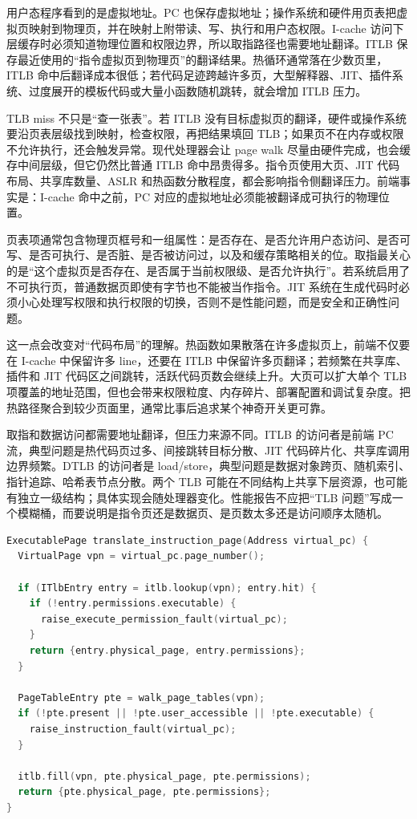 用户态程序看到的是虚拟地址。PC 也保存虚拟地址；操作系统和硬件用页表把虚拟页映射到物理页，并在映射上附带读、写、执行和用户态权限。I-cache 访问下层缓存时必须知道物理位置和权限边界，所以取指路径也需要地址翻译。ITLB 保存最近使用的“指令虚拟页到物理页”的翻译结果。热循环通常落在少数页里，ITLB 命中后翻译成本很低；若代码足迹跨越许多页，大型解释器、JIT、插件系统、过度展开的模板代码或大量小函数随机跳转，就会增加 ITLB 压力。

TLB miss 不只是“查一张表”。若 ITLB 没有目标虚拟页的翻译，硬件或操作系统要沿页表层级找到映射，检查权限，再把结果填回 TLB；如果页不在内存或权限不允许执行，还会触发异常。现代处理器会让 page walk 尽量由硬件完成，也会缓存中间层级，但它仍然比普通 ITLB 命中昂贵得多。指令页使用大页、JIT 代码布局、共享库数量、ASLR 和热函数分散程度，都会影响指令侧翻译压力。前端事实是：I-cache 命中之前，PC 对应的虚拟地址必须能被翻译成可执行的物理位置。

页表项通常包含物理页框号和一组属性：是否存在、是否允许用户态访问、是否可写、是否可执行、是否脏、是否被访问过，以及和缓存策略相关的位。取指最关心的是“这个虚拟页是否存在、是否属于当前权限级、是否允许执行”。若系统启用了不可执行页，普通数据页即使有字节也不能被当作指令。JIT 系统在生成代码时必须小心处理写权限和执行权限的切换，否则不是性能问题，而是安全和正确性问题。

这一点会改变对“代码布局”的理解。热函数如果散落在许多虚拟页上，前端不仅要在 I-cache 中保留许多 line，还要在 ITLB 中保留许多页翻译；若频繁在共享库、插件和 JIT 代码区之间跳转，活跃代码页数会继续上升。大页可以扩大单个 TLB 项覆盖的地址范围，但也会带来权限粒度、内存碎片、部署配置和调试复杂度。把热路径聚合到较少页面里，通常比事后追求某个神奇开关更可靠。

取指和数据访问都需要地址翻译，但压力来源不同。ITLB 的访问者是前端 PC 流，典型问题是热代码页过多、间接跳转目标分散、JIT 代码碎片化、共享库调用边界频繁。DTLB 的访问者是 load/store，典型问题是数据对象跨页、随机索引、指针追踪、哈希表节点分散。两个 TLB 可能在不同结构上共享下层资源，也可能有独立一级结构；具体实现会随处理器变化。性能报告不应把“TLB 问题”写成一个模糊桶，而要说明是指令页还是数据页、是页数太多还是访问顺序太随机。

\begin{lstlisting}[language=C++,caption={指令页翻译的抽象伪代码}]
ExecutablePage translate_instruction_page(Address virtual_pc) {
  VirtualPage vpn = virtual_pc.page_number();

  if (ITlbEntry entry = itlb.lookup(vpn); entry.hit) {
    if (!entry.permissions.executable) {
      raise_execute_permission_fault(virtual_pc);
    }
    return {entry.physical_page, entry.permissions};
  }

  PageTableEntry pte = walk_page_tables(vpn);
  if (!pte.present || !pte.user_accessible || !pte.executable) {
    raise_instruction_fault(virtual_pc);
  }

  itlb.fill(vpn, pte.physical_page, pte.permissions);
  return {pte.physical_page, pte.permissions};
}
\end{lstlisting}

